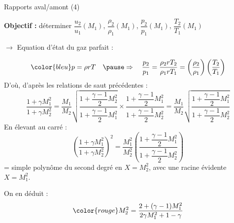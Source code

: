 \begin{frame}{Rapports aval/amont (4)}

\small

\textbf{Objectif :} 
déterminer $\dfrac{u_2}{u_1}(M_1)$, $\dfrac{\rho_2}{\rho_1}(M_1)$, 
$\dfrac{p_2}{p_1}(M_1)$, $\dfrac{T_2}{T_1}(M_1)$

\bigskip

\pause

$\rightarrow$ Equation d'état du gaz parfait :

\[ \color{bleu}
	p = \rho r T \quad 
	\pause
	\Rightarrow \quad \frac{p_2}{p_1} = \frac{\rho_2 r T_2}{\rho_1 r T_1}
	= \left ( \frac{\rho_2}{\rho_1} \right ) \left ( \frac{T_2}{T_1} \right )
\]
\pause
D'où, d'après les relations de saut précédentes :
\[
	\frac{1 + \gamma M_1^2}{1 + \gamma M_2^2} =
	\frac{M_1}{M_2} 
	\sqrt{\frac{1 + \dfrac{\gamma - 1}{2} M_2^2}{1 + \dfrac{\gamma - 1}{2} M_1^2}}
	\times
	\frac{1 + \dfrac{\gamma - 1}{2} M_1^2}{1 + \dfrac{\gamma - 1}{2} M_2^2}
	=
	\frac{M_1}{M_2} 
	\sqrt{\frac{1 + \dfrac{\gamma - 1}{2} M_1^2}{1 + \dfrac{\gamma - 1}{2} M_2^2}}
\]
\pause
En élevant au carré :
\[
	\left (\frac{1 + \gamma M_1^2}{1 + \gamma M_2^2} \right )^2=
	\frac{M_1^2}{M_2^2} 
	\left (\frac{1 + \dfrac{\gamma - 1}{2} M_1^2}{1 + \dfrac{\gamma - 1}{2} M_2^2}\right)
\]
\pause
= simple polynôme du second degré en $X = M_2^2$, avec une racine évidente $X = M_1^2$.

\pause

\medskip
On en déduit :
\begin{equation}
	\color{rouge}
	M_2^2 = \frac{2+(\gamma-1)M_1^2}{2\gamma M_1^2 +1-\gamma}
\end{equation}

\vspace{0mm}

\end{frame}



